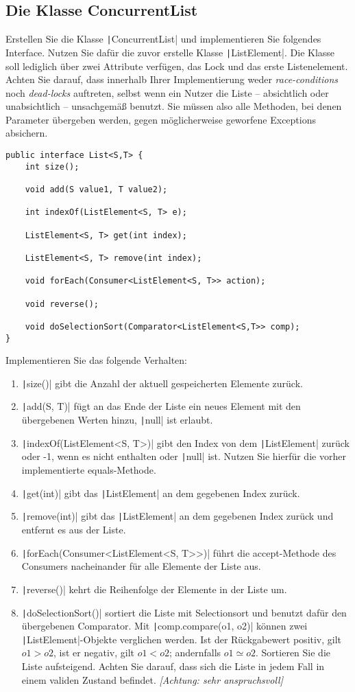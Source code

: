 \documentclass[11pt]{article} %
\newcommand{\code}[1]{\texttt|#1|}
\begin{document}
\subsection{Die Klasse ConcurrentList}
Erstellen Sie die Klasse \code{ConcurrentList} und implementieren Sie folgendes Interface. Nutzen Sie dafür die zuvor erstelle Klasse \code{ListElement}. Die Klasse soll lediglich über zwei Attribute verfügen, das Lock und das erste Listenelement. Achten Sie darauf, dass innerhalb Ihrer Implementierung weder \emph{race-conditions} noch \emph{dead-locks} auftreten, selbst wenn ein Nutzer die Liste \linebreak[2] – absichtlich oder unabsichtlich – unsachgemäß benutzt. Sie müssen also alle Methoden, bei denen Parameter übergeben werden, gegen möglicherweise geworfene Exceptions absichern.
\begin{verbatim}
public interface List<S,T> {
	int size();
	
	void add(S value1, T value2);
	
	int indexOf(ListElement<S, T> e);
	
	ListElement<S, T> get(int index); 
	
	ListElement<S, T> remove(int index);
	
	void forEach(Consumer<ListElement<S, T>> action);

	void reverse();
	
	void doSelectionSort(Comparator<ListElement<S,T>> comp);
}
\end{verbatim}
Implementieren Sie das folgende Verhalten:
\begin{enumerate}
\item \code{size()} gibt die Anzahl der aktuell gespeicherten Elemente zurück.
\item \code{add(S, T)} fügt an das Ende der Liste ein neues Element mit den übergebenen Werten hinzu, \code{null} ist erlaubt.
\item \code{indexOf(ListElement<S, T>)} gibt den Index von dem \code{ListElement} zurück oder -1, wenn es nicht enthalten oder \code{null} ist. Nutzen Sie hierfür die vorher implementierte equals-Methode.
\item \code{get(int)} gibt das \code{ListElement} an dem gegebenen Index zurück.
\item \code{remove(int)} gibt das \code{ListElement} an dem gegebenen Index zurück und entfernt es aus der Liste.
\item \code{forEach(Consumer<ListElement<S, T>>)} führt die accept-Methode des Consumers nacheinander für alle Elemente der Liste aus.
\item \code{reverse()} kehrt die Reihenfolge der Elemente in der Liste um.
\item \code{doSelectionSort()} sortiert die Liste mit Selectionsort und benutzt dafür den übergebenen Comparator. Mit \code{comp.compare(o1, o2)} können zwei \code{ListElement}-Objekte verglichen werden. Ist der Rückgabewert positiv, gilt $o1 > o2$, ist er negativ, gilt $o1 < o2$; andernfalls $o1 \simeq o2$. Sortieren Sie die Liste aufsteigend. Achten Sie darauf, dass sich die Liste in jedem Fall in einem validen Zustand befindet. \hspace*{\fill}\emph{[Achtung: sehr anspruchsvoll]}
\end{enumerate}
\end{document}
